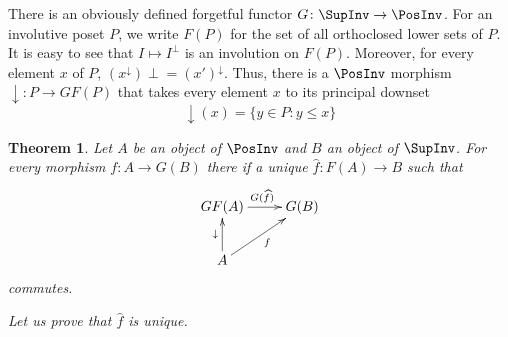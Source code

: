 \documentclass{article}
\newtheorem{theorem}{Theorem}[section]
\theoremstyle{definition}
\begin{document}
There is an obviously defined forgetful functor $G\colon\SupInv\to\PosInv$.
For an involutive  poset $P$, we write $F(P)$ for the set of all orthoclosed lower sets of $P$.
It is easy to see that $I\mapsto I^\perp$ is an involution on $F(P)$. Moreover,
for every element $x$ of $P$, $(x^\downarrow)\perp=(x')^\downarrow$.
Thus, there is a $\PosInv$ morphism $\downarrow\colon P\to GF(P)$ that takes every
element $x$ to its principal downset
$$
\downarrow(x)=\{y\in P:y\leq x\}
$$
\begin{theorem}
Let $A$ be an object of $\PosInv$ and $B$ an object of $\SupInv$.
For every morphism $f\colon A\to G(B)$ there if a unique $\widehat f\colon F(A)\to B$ 
such that
$$
\xymatrix{
GF(A)
	\ar[r]^{G(\widehat f)}
&
G(B)
\\
A
	\ar[u]^{\downarrow}
	\ar[ru]_{f}
}
$$
commutes.

Let us prove that $\widehat f$ is unique.
\end{theorem}
\end{document}
